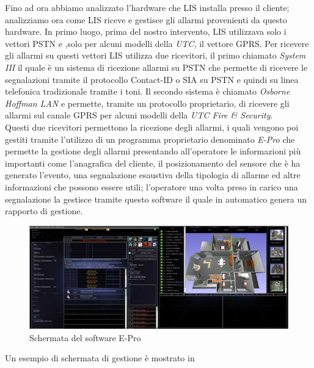 Fino ad ora abbiamo analizzato l'hardware che LIS installa presso il cliente; analizziamo ora come LIS riceve e gestisce gli allarmi provenienti da questo hardware. In primo luogo, prima del nostro intervento, LIS utilizzava solo i vettori PSTN e ,solo per alcuni modelli della \emph{UTC}, il vettore GPRS. Per ricevere gli allarmi su questi vettori LIS utilizza due ricevitori, il primo chiamato \emph{System III} il quale è un sistema di ricezione allarmi su PSTN che permette di ricevere le segnalazioni tramite il protocollo Contact-ID o SIA su PSTN e quindi su linea telefonica tradizionale tramite i toni. Il secondo sistema è chiamato \emph{Osborne Hoffman LAN} e permette, tramite un protocollo proprietario, di ricevere gli allarmi sul canale GPRS per alcuni modelli della \emph{UTC Fire \& Security}.\\
Questi due ricevitori permettono la ricezione degli allarmi, i quali vengono poi gestiti tramite l'utilizzo di un programma proprietario denominato \emph{E-Pro} che permette la gestione degli allarmi presentando all'operatore le informazioni più importanti come l'anagrafica del cliente, il posizionamento del sensore che è ha generato l'evento, una segnalazione esaustiva della tipologia di allarme ed altre informazioni che possono essere utili; l'operatore una volta preso in carico una segnalazione la gestisce tramite questo software il quale in automatico genera un rapporto di gestione.
\begin{figure}
	\centering
	\includegraphics[width=\linewidth]{pictures/schermataepro.jpg}
	\caption{Schermata del software E-Pro}\label{fig:epro}
\end{figure}
Un esempio di schermata di gestione è mostrato in 
